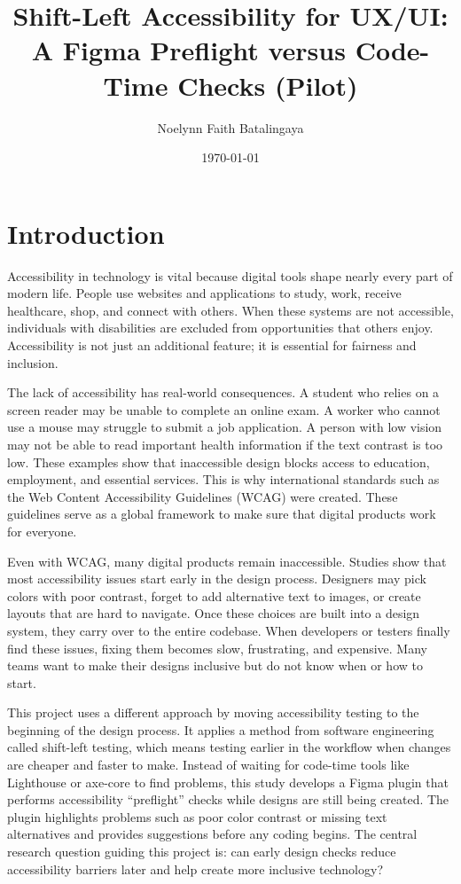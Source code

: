 \documentclass[12pt]{article}
\title{Shift-Left Accessibility for UX/UI: A Figma Preflight versus Code-Time Checks (Pilot)}
\author{Noelynn Faith Batalingaya}
\date{\today}
\begin{document}
\maketitle

\section{Introduction}
Accessibility in technology is vital because digital tools shape nearly every part of modern life.
People use websites and applications to study, work, receive healthcare, shop, and connect with
others. When these systems are not accessible, individuals with disabilities are excluded from
opportunities that others enjoy. Accessibility is not just an additional feature; it is essential for fairness
and inclusion.

The lack of accessibility has real-world consequences. A student who relies on a screen reader
may be unable to complete an online exam. A worker who cannot use a mouse may struggle to
submit a job application. A person with low vision may not be able to read important health information
if the text contrast is too low. These examples show that inaccessible design blocks access to
education, employment, and essential services. This is why international standards such as the
Web Content Accessibility Guidelines (WCAG) were created. These guidelines serve as a global
framework to make sure that digital products work for everyone.

Even with WCAG, many digital products remain inaccessible. Studies show that most accessibility
issues start early in the design process. Designers may pick colors with poor contrast, forget to
add alternative text to images, or create layouts that are hard to navigate. Once these choices are
built into a design system, they carry over to the entire codebase. When developers or testers finally
find these issues, fixing them becomes slow, frustrating, and expensive. Many teams want to make
their designs inclusive but do not know when or how to start.

This project uses a different approach by moving accessibility testing to the beginning of the design
process. It applies a method from software engineering called shift-left testing, which means testing
earlier in the workflow when changes are cheaper and faster to make. Instead of waiting for code-time
tools like Lighthouse or axe-core to find problems, this study develops a Figma plugin that performs
accessibility “preflight” checks while designs are still being created. The plugin highlights problems
such as poor color contrast or missing text alternatives and provides suggestions before any coding
begins. The central research question guiding this project is: can early design checks reduce accessibility
barriers later and help create more inclusive technology?
\end{document}
